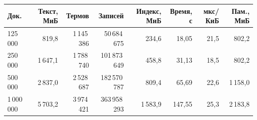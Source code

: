 \begin{tabular}{|l|r|r|r|r|r|r|r|}
\hline
Док. & Текст, МиБ & Термов & Записей & Индекс, МиБ & Время, с & мкс/КиБ & Пам., МиБ \\
\hline
125\,000 & 819,8 & 1\,145\,386 & 50\,684\,675 & 234,6 & 18,05 & 21,5 & 802,2 \\
\hline
250\,000 & 1\,647,1 & 1\,788\,740 & 101\,873\,649 & 458,8 & 31,13 & 18,5 & 802,2 \\
\hline
500\,000 & 2\,837,0 & 2\,528\,687 & 182\,570\,787 & 809,4 & 65,69 & 22,6 & 1\,158,0 \\
\hline
1\,000\,000 & 5\,703,2 & 3\,974\,421 & 363\,958\,293 & 1\,583,9 & 147,55 & 25,3 & 2\,183,8 \\
\hline
\end{tabular}
